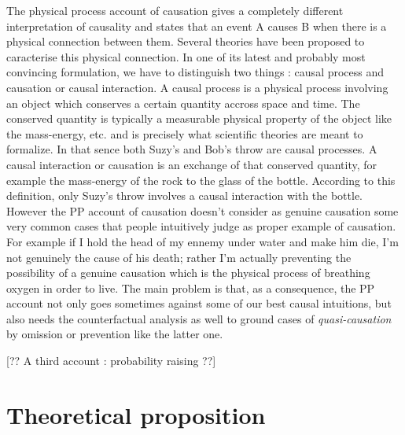 \documentclass[10pt,letterpaper]{article}
\begin{document}
The physical process account of causation gives a completely different interpretation of causality and states that an event A causes B when there is a physical connection between them. Several theories have been proposed to caracterise this physical connection. In one of its latest and probably most convincing formulation, we have to distinguish two things : causal process and causation or causal interaction. A causal process is a physical process involving an object which conserves a certain quantity accross space and time. The conserved quantity is typically a measurable physical property of the object like the mass-energy, etc. and is precisely what scientific theories are meant to formalize. In that sence both Suzy's and Bob's throw are causal processes. A causal interaction or causation is an exchange of that conserved quantity, for example the mass-energy of the rock to the glass of the bottle. According to this definition, only Suzy's throw involves a causal interaction with the bottle. However the PP account of causation doesn't consider as genuine causation some very common cases that people intuitively judge as proper example of causation. For example if I hold the head of my ennemy under water and make him die, I'm not genuinely the cause of his death; rather I'm actually preventing the possibility of a genuine causation which is the physical process of breathing oxygen in order to live. The main problem is that, as a consequence, the PP account not only goes sometimes against some of our best causal intuitions, but also needs the counterfactual analysis as well to ground cases of \textit{quasi-causation} by omission or prevention like the latter one.


[?? A third account : probability raising ??]


\section{Theoretical proposition}
\end{document}
